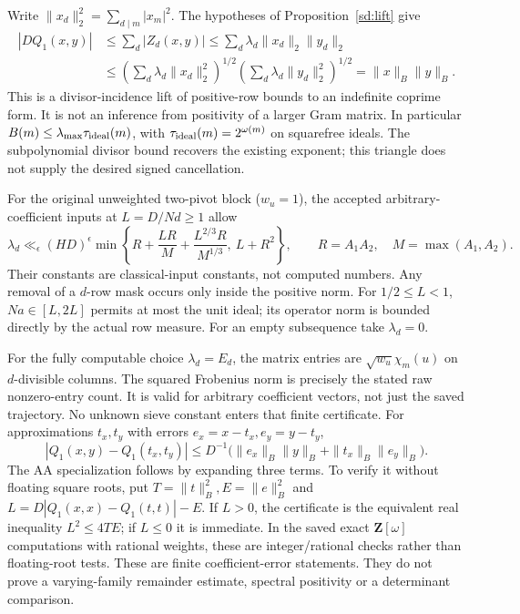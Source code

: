 \documentclass[11pt]{article}
\theoremstyle{definition}\newtheorem{definition}[theorem]{Definition}
\theoremstyle{remark}\newtheorem{remark}[theorem]{Remark}
\begin{document}
Write $\|x_d\|_2^2=\sum_{d\mid m}|x_m|^2$.
The hypotheses of Proposition~\ref{sd:lift} give
\[
 \begin{split}
 |DQ_1(x,y)|&\le\sum_d |Z_d(x,y)|
 \le\sum_d\lambda_d\|x_d\|_2\|y_d\|_2\\
 &\le\left(\sum_d\lambda_d\|x_d\|_2^2\right)^{1/2}
       \left(\sum_d\lambda_d\|y_d\|_2^2\right)^{1/2}
 =\|x\|_B\|y\|_B.
 \end{split}
\]
This is a divisor-incidence lift of positive-row bounds to an indefinite
coprime form. It is not an inference from positivity of a larger Gram
matrix. In particular $B(m)\le\lambda_{\max}\tau_{\rm ideal}(m)$,
with $\tau_{\rm ideal}(m)=2^{\omega(m)}$ on squarefree ideals.
The subpolynomial divisor bound recovers the existing exponent; this
triangle does not supply the desired signed cancellation.

For the original unweighted two-pivot block ($w_u=1$), the accepted
arbitrary-coefficient inputs
at $L=D/Nd\ge1$ allow
\[
 \lambda_d\ll_\epsilon(HD)^\epsilon
 \min\left\{R+\frac{LR}{M}+\frac{L^{2/3}R}{M^{1/3}},\ L+R^2\right\},
 \qquad R=A_1A_2,\quad M=\max(A_1,A_2).
\]
Their constants are classical-input constants, not computed numbers.
Any removal of a $d$-row mask occurs only inside the positive norm.
For $1/2\le L<1$, $Na\in[L,2L]$ permits at most the unit ideal; its
operator norm is bounded directly by the actual row measure.
For an empty subsequence take $\lambda_d=0$.

For the fully computable choice $\lambda_d=E_d$, the matrix entries are
$\sqrt{w_u}\chi_m(u)$ on $d$-divisible columns. The squared Frobenius
norm is precisely the stated raw nonzero-entry count. It is valid for
arbitrary coefficient vectors, not just the saved trajectory. No unknown
sieve constant enters that finite certificate.
For approximations $t_x,t_y$ with errors $e_x=x-t_x,e_y=y-t_y$,
\[
 |Q_1(x,y)-Q_1(t_x,t_y)|
 \le D^{-1}\bigl(\|e_x\|_B\|y\|_B+
                    \|t_x\|_B\|e_y\|_B\bigr).
\]
The AA specialization follows by expanding three terms. To verify it
without floating square roots, put $T=\|t\|_B^2,E=\|e\|_B^2$ and
$L=D|Q_1(x,x)-Q_1(t,t)|-E$.
If $L>0$, the certificate is the equivalent real inequality
$L^2\le4TE$; if $L\le0$ it is immediate. In the saved exact
$\mathbf Z[\omega]$ computations with rational weights, these are
integer/rational checks rather than floating-root tests.
These are finite coefficient-error statements. They do not prove a
varying-family remainder estimate, spectral positivity or a determinant
comparison.
\end{document}
